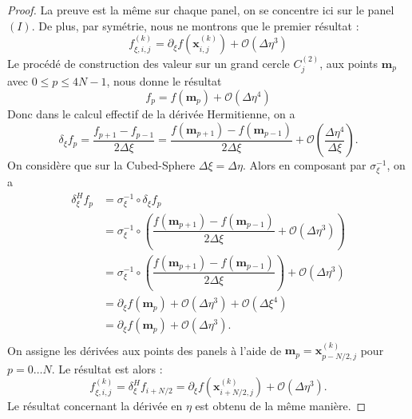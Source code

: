 \begin{proof}
La preuve est la même sur chaque panel, on se concentre ici sur le panel $(I)$. De plus, par symétrie, nous ne montrons que le premier résultat :
\begin{equation}
f_{\xi,i,j}^{(k)} = \partial_{\xi} f(\mathbf{x}_{i,j}^{(k)}) + \mathcal{O}(\Delta \eta^3)
\end{equation}
Le procédé de construction des valeur sur un grand cercle $C_j^{(2)}$, aux points $\mathbf{m}_p$ avec $0 \leq p \leq 4N-1$, nous donne le résultat
\begin{equation}
f_p = f(\mathbf{m}_p) + \mathcal{O}(\Delta \eta^4)
\end{equation}
Donc dans le calcul effectif de la dérivée Hermitienne, on a 
\begin{equation}
\delta_{\xi} f_p = \dfrac{f_{p+1} - f_{p-1}}{2 \Delta \xi} = \dfrac{f(\mathbf{m}_{p+1}) - f(\mathbf{m}_{p-1})}{2 \Delta \xi} + \mathcal{O}\left( \dfrac{\Delta \eta^4}{\Delta \xi} \right).
\end{equation}
On considère que sur la Cubed-Sphere $\Delta \xi = \Delta \eta$. Alors en composant par $\sigma_{\xi}^{-1}$, on a 
\begin{align*}
\delta_{\xi}^H f_p & = \sigma_{\xi}^{-1} \circ \delta_{\xi} f_p \\
                   & = \sigma_{\xi}^{-1} \circ \left( \dfrac{f(\mathbf{m}_{p+1}) - f(\mathbf{m}_{p-1})}{2 \Delta \xi} + \mathcal{O}\left( \Delta \eta^3 \right) \right)\\
                   & = \sigma_{\xi}^{-1} \circ \left( \dfrac{f(\mathbf{m}_{p+1}) - f(\mathbf{m}_{p-1})}{2 \Delta \xi}\right)  + \mathcal{O}\left( \Delta \eta^3 \right) \\
                   & = \partial_{\xi}f(\mathbf{m}_p) + \mathcal{O}\left( \Delta \eta^3 \right) + \mathcal{O}\left( \Delta \xi^4 \right) \\
                   & = \partial_{\xi}f(\mathbf{m}_p) + \mathcal{O}\left( \Delta \eta^3 \right).\\
\end{align*}
On assigne les dérivées aux points des panels à l'aide de $\mathbf{m}_p=\mathbf{x}^{(k)}_{p-N/2,j}$ pour $p = 0 \ldots N$. Le résultat est alors :
\begin{equation}
f^{(k)}_{\xi,i,j} = \delta_{\xi}^H f_{i+N/2} = \partial_{\xi} f(\mathbf{x}^{(k)}_{i+N/2,j}) + \mathcal{O}\left( \Delta \eta^3 \right).
\end{equation}
Le résultat concernant la dérivée en $\eta$ est obtenu de la même manière.
\end{proof}


